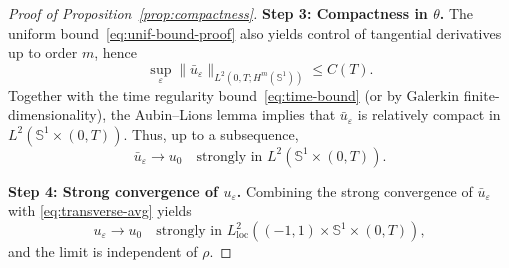 \documentclass[10pt,a4paper]{amsart}
\begin{document}
\begin{proof}[Proof of Proposition~\ref{prop:compactness}]
\smallskip
\noindent\textbf{Step 3: Compactness in \(\theta\).}
The uniform bound~\eqref{eq:unif-bound-proof} also yields control of tangential
derivatives up to order \(m\), hence
\[
\sup_{\varepsilon}\|\bar u_\varepsilon\|_{L^2(0,T;H^m(\mathbb S^1))}\le C(T).
\]
Together with the time regularity bound~\eqref{eq:time-bound} (or by Galerkin
finite-dimensionality), the Aubin--Lions lemma implies that \(\bar u_\varepsilon\)
is relatively compact in \(L^2(\mathbb S^1\times(0,T))\).
Thus, up to a subsequence,
\[
\bar u_\varepsilon \to u_0 \quad\text{strongly in }L^2(\mathbb S^1\times(0,T)).
\]

\smallskip
\noindent\textbf{Step 4: Strong convergence of \(u_\varepsilon\).}
Combining the strong convergence of \(\bar u_\varepsilon\) with
\eqref{eq:transverse-avg} yields
\[
u_\varepsilon \to u_0
\quad\text{strongly in }L^2_{\mathrm{loc}}((-1,1)\times\mathbb S^1\times(0,T)),
\]
and the limit is independent of \(\rho\).
\end{proof}
\end{document}
